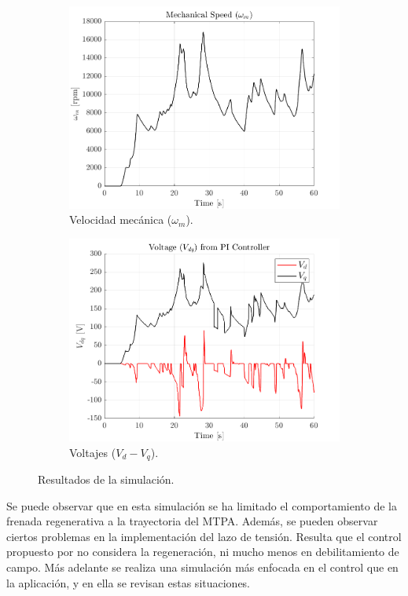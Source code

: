 \begin{figure}[!htb]
\begin{subfigure}{0.4\textwidth}
        \includegraphics[width=\linewidth]{fig/wm_plot.png}
        \caption{Velocidad mecánica ($\omega_{m}$).}
    \end{subfigure}
    \begin{subfigure}{0.4\textwidth}
        \includegraphics[width=\linewidth]{fig/vdvqPI_plot.png}
        \caption{Voltajes ($V_{d} - V_{q}$).}
    \end{subfigure}
    \caption{Resultados de la simulación.}
    
\end{figure}

Se puede observar que en esta simulación se ha limitado el comportamiento de la frenada regenerativa a la trayectoria del MTPA. Además, se pueden observar ciertos problemas en la implementación del lazo de tensión. Resulta que el control propuesto por \cite{carlos2023} no considera la regeneración, ni mucho menos en debilitamiento de campo. Más adelante se realiza una simulación más enfocada en el control que en la aplicación, y en ella se revisan estas situaciones.

